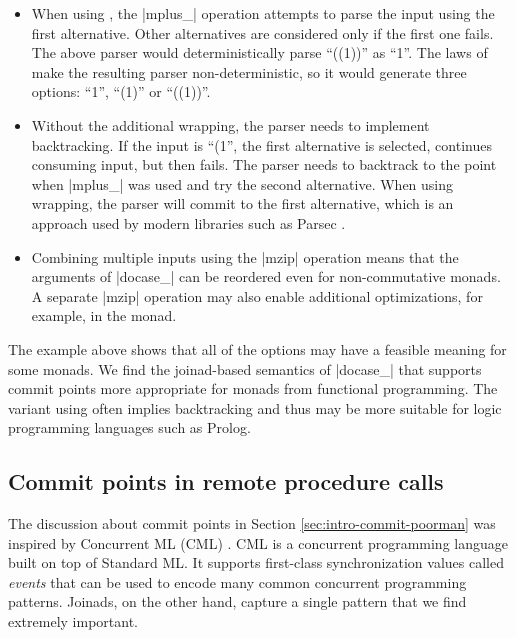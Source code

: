 \documentclass{sigplanconf}
\begin{document}
\begin{itemize}
\item When using , the |mplus_| operation attempts to parse the input using the
  first alternative. Other alternatives are considered only if the first one fails. The above parser 
  would deterministically parse ``((1))'' as ``1''. The laws of  make the resulting 
  parser non-deterministic, so it would generate three options: ``1'', ``(1)'' or ``((1))''.

\item Without the additional wrapping, the parser needs to implement backtracking. If the
  input is ``(1'', the first alternative is selected, continues consuming input, but then fails.
  The parser needs to backtrack to the point when |mplus_| was used and try the second alternative. 
  When using wrapping, the parser will commit to the first alternative, which is an approach used
  by modern libraries such as Parsec \cite{parsec}.

\item Combining multiple inputs using the |mzip| operation means that the arguments of |docase_|
  can be reordered even for non-commutative monads. A separate |mzip| operation may also enable 
  additional optimizations, for example, in the  monad.

\end{itemize}
The example above shows that all of the options may have a feasible meaning for some monads. We find 
the joinad-based semantics of |docase_| that supports commit points more appropriate for monads from 
functional programming. The variant using  often implies backtracking and thus may 
be more suitable for logic programming languages such as Prolog. 


\subsection{Commit points in remote procedure calls}
The discussion about commit points in Section \ref{sec:intro-commit-poorman} was inspired by 
Concurrent ML (CML) \cite{concurrentml}. CML is a concurrent programming language built on top
of Standard ML. It supports first-class synchronization values called \textit{events} that can 
be used to encode many common concurrent programming patterns. Joinads, on the other hand, capture 
a single pattern that we find extremely important. 
\end{document}
